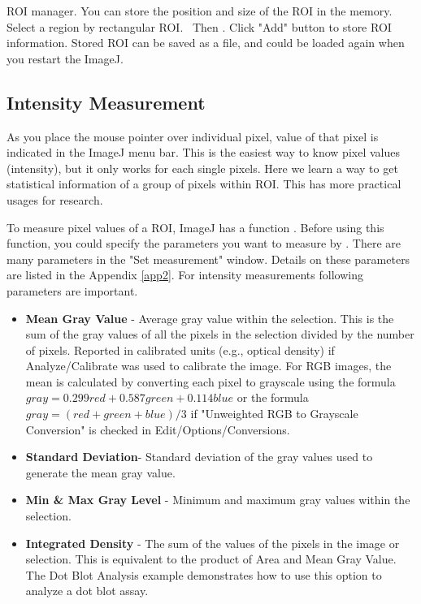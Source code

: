 \begin{indentexercise}{5}
ROI manager. You can store the position and
size of the ROI in the memory. Select a region by rectangular ROI.
\ Then . Click "Add" button to store
ROI information. Stored ROI can be saved as a file, and could be loaded
again when you restart the ImageJ.
\end{indentexercise}


\subsection{Intensity Measurement}

As you place the mouse pointer over individual pixel, value of that
pixel is indicated in the ImageJ menu bar. This is the easiest way to
know pixel values (intensity), but it only works for each single
pixels. Here we learn a way to get statistical information of a group
of pixels within ROI. This has more practical usages for research. 

To measure pixel values of a ROI, ImageJ has a function . Before using this function, you could specify
the parameters you want to measure by . There are many parameters in the
"Set measurement" window. Details on
these parameters are listed in the Appendix \ref{app2}. For intensity
measurements following parameters are important. 

\begin{itemize}
\item \textbf{Mean Gray Value} - Average gray value within the selection. This
is the sum of the gray values of all the pixels in the selection
divided by the number of pixels. Reported in calibrated units (e.g.,
optical density) if Analyze/Calibrate was used to calibrate the image.
For RGB images, the mean is calculated by converting each pixel to
grayscale using the formula $gray=0.299red+0.587green+0.114blue$ or the
formula $gray=(red+green+blue)/3$ if "Unweighted RGB to
Grayscale Conversion" is checked in Edit/Options/Conversions.

\item\textbf{Standard Deviation}{}- Standard deviation of the gray values
used to generate the mean gray value.

\item\textbf{Min \& Max Gray Level} - Minimum and maximum gray values within
the selection.

\item\textbf{Integrated Density} - The sum of the values of the pixels in the
image or selection. This is equivalent to the product of Area and Mean
Gray Value. The Dot Blot Analysis example demonstrates how to use this
option to analyze a dot blot assay.
\end{itemize}

